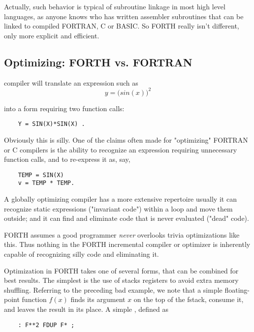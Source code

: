 Actually, such behavior is typical of subroutine linkage in most high
level languages, as anyone knows who has written assembler subroutines that can
be linked to compiled FORTRAN, C or BASIC.
So FORTH really isn't different, only more explicit and efficient.

\subsection{Optimizing: FORTH vs. FORTRAN}
 compiler will translate an expression such as
\begin{equation}
     y=\Big( sin(x) \Big)^2\nonumber
\end{equation}

into a form requiring two function calls:

\begin{lstlisting}
    Y = SIN(X)*SIN(X) .
\end{lstlisting}

Obviously this is silly. One of the claims often made for "optimizing" FORTRAN or C compilers is the ability to recognize an expression requiring unnecessary function calls, and to re-express it as, say,
  
\begin{lstlisting}
    TEMP = SIN(X)
    v = TEMP * TEMP.
\end{lstlisting}

A globally optimizing compiler has a more extensive repertoire
usually it can recognize static expressions ("invariant code")
within a loop and move them outside; and it can find and eliminate code that is
never evaluated ("dead" code).

FORTH assumes a good programmer \textit{never} overlooks trivia
optimizations like this. Thus nothing in the FORTH incremental
compiler or optimizer is inherently capable of recognizing silly
code and eliminating it.

Optimization in FORTH takes one of several forms, that can be
combined for best results. The simplest is the use of stacks
registers to avoid extra memory shuffling. Referring to the
preceding bad example, we note that a simple floating-point
function $f(x)$ finds its argument $x$ on the top of the fstack, consume
it, and leaves the result in its place. A simple , defined as

\begin{lstlisting}
    : F**2 FDUP F* ;
\end{lstlisting}

